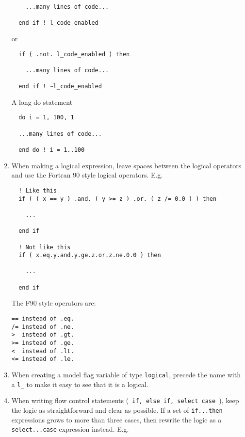 \documentclass[letterpaper,12pt]{article}
\begin{document}
\begin{enumerate}
\begin{verbatim}
    ...many lines of code...

  end if ! l_code_enabled
\end{verbatim}

or 

\begin{verbatim}
  if ( .not. l_code_enabled ) then

    ...many lines of code...

  end if ! ~l_code_enabled
\end{verbatim}

A long do statement

\begin{verbatim}
  do i = 1, 100, 1

  ...many lines of code...

  end do ! i = 1..100
\end{verbatim}

\item When making a logical expression, leave spaces between the 
logical operators and use the Fortran 90 style logical operators. \newline
 E.g.
\begin{verbatim}
  ! Like this
  if ( ( x == y ) .and. ( y >= z ) .or. ( z /= 0.0 ) ) then

    ...

  end if

  ! Not like this
  if ( x.eq.y.and.y.ge.z.or.z.ne.0.0 ) then

    ...

  end if

\end{verbatim}

The F90 style operators are:
\newline

\begin{verbatim}
== instead of .eq.
/= instead of .ne.
>  instead of .gt.
>= instead of .ge.
<  instead of .lt.
<= instead of .le.
\end{verbatim}

\item When creating a model flag variable of type \texttt{logical}, precede the
 name with a \verb|l_| to make it easy to see that it is a logical.

\item When writing flow control statements 
(\texttt{ if, else if, select case }), keep the logic as straightforward and
clear as possible.  If a set of \texttt{if...then} expressions grows to more
than three cases, then rewrite the logic as a \texttt{select...case} expression
instead. E.g.


\end{enumerate}
\end{document}
